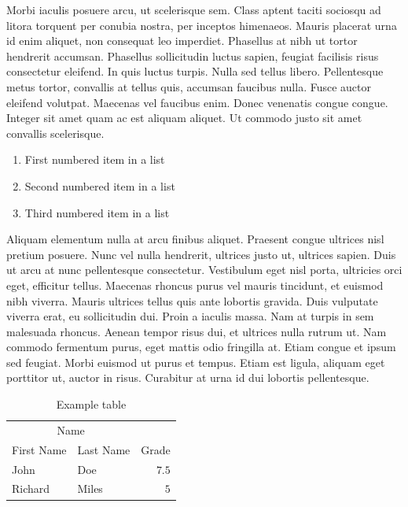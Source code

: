 \documentclass[10pt, a4paper, twocolumn]{article} %
\begin{document}
Morbi iaculis posuere arcu, ut scelerisque sem. Class aptent taciti sociosqu ad litora torquent per conubia nostra, per inceptos himenaeos. Mauris placerat urna id enim aliquet, non consequat leo imperdiet. Phasellus at nibh ut tortor hendrerit accumsan. Phasellus sollicitudin luctus sapien, feugiat facilisis risus consectetur eleifend. In quis luctus turpis. Nulla sed tellus libero. Pellentesque metus tortor, convallis at tellus quis, accumsan faucibus nulla. Fusce auctor eleifend volutpat. Maecenas vel faucibus enim. Donec venenatis congue congue. Integer sit amet quam ac est aliquam aliquet. Ut commodo justo sit amet convallis scelerisque.

\begin{enumerate}
	\item First numbered item in a list
	\item Second numbered item in a list
	\item Third numbered item in a list
\end{enumerate}

Aliquam elementum nulla at arcu finibus aliquet. Praesent congue ultrices nisl pretium posuere. Nunc vel nulla hendrerit, ultrices justo ut, ultrices sapien. Duis ut arcu at nunc pellentesque consectetur. Vestibulum eget nisl porta, ultricies orci eget, efficitur tellus. Maecenas rhoncus purus vel mauris tincidunt, et euismod nibh viverra. Mauris ultrices tellus quis ante lobortis gravida. Duis vulputate viverra erat, eu sollicitudin dui. Proin a iaculis massa. Nam at turpis in sem malesuada rhoncus. Aenean tempor risus dui, et ultrices nulla rutrum ut. Nam commodo fermentum purus, eget mattis odio fringilla at. Etiam congue et ipsum sed feugiat. Morbi euismod ut purus et tempus. Etiam est ligula, aliquam eget porttitor ut, auctor in risus. Curabitur at urna id dui lobortis pellentesque.

\begin{table}
	\caption{Example table}
	\centering
	\begin{tabular}{llr}
		\toprule
		\multicolumn{2}{c}{Name} \\
		\cmidrule(r){1-2}
		First Name & Last Name & Grade \\
		\midrule
		John & Doe & $7.5$ \\
		Richard & Miles & $5$ \\
		\bottomrule
	\end{tabular}
\end{table}

\end{document}

